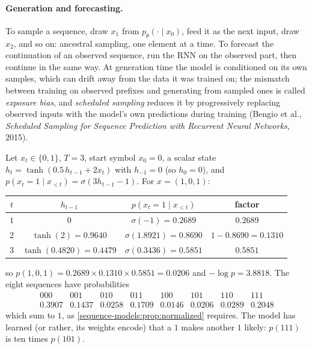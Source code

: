 \begin{notechapter}
\paragraph{Generation and forecasting.} To sample a sequence, draw $x_1$ from $p_\theta(\cdot\mid x_0)$, feed it as
the next input, draw $x_2$, and so on: ancestral sampling, one element at a time. To forecast
the continuation of an observed sequence, run the RNN on the observed part, then continue
in the same way. At generation time the model is conditioned on its own samples, which can
drift away from the data it was trained on; the mismatch between training on observed
prefixes and generating from sampled ones is called \emph{exposure bias}, and
\emph{scheduled sampling} reduces it by progressively replacing observed inputs with the
model's own predictions during training (Bengio et al., \emph{Scheduled Sampling for Sequence
Prediction with Recurrent Neural Networks}, 2015).

\begin{example}\label{sequence-models:ex:binary}
Let $x_t\in\{0, 1\}$, $T = 3$, start symbol $x_0 = 0$, a scalar state $h_t = \tanh(0.5\,h_{t-1} + 2x_t)$ with $h_{-1} = 0$ (so $h_0 = 0$), and
$p(x_t = 1\mid x_{<t}) = \sigma(3h_{t-1} - 1)$. For $x = (1, 0, 1)$:
\begin{center}
\begin{tabular}{c|ccc}
$t$ & $h_{t-1}$ & $p(x_t = 1\mid x_{<t})$ & factor\\\hline
$1$ & $0$ & $\sigma(-1) = 0.2689$ & $0.2689$\\
$2$ & $\tanh(2) = 0.9640$ & $\sigma(1.8921) = 0.8690$ & $1 - 0.8690 = 0.1310$\\
$3$ & $\tanh(0.4820) = 0.4479$ & $\sigma(0.3436) = 0.5851$ & $0.5851$
\end{tabular}
\end{center}
so $p(1, 0, 1) = 0.2689\times0.1310\times0.5851 = 0.0206$ and $-\log p = 3.8818$. The eight sequences have probabilities
\[
  \begin{array}{cccccccc}
  000 & 001 & 010 & 011 & 100 & 101 & 110 & 111\\
  0.3907 & 0.1437 & 0.0258 & 0.1709 & 0.0146 & 0.0206 & 0.0289 & 0.2048
  \end{array}
\]
which sum to $1$, as \cref{sequence-models:prop:normalized} requires. The model has learned (or rather, its
weights encode) that a $1$ makes another $1$ likely: $p(111)$ is ten times $p(101)$.
\end{example}


\end{notechapter}
